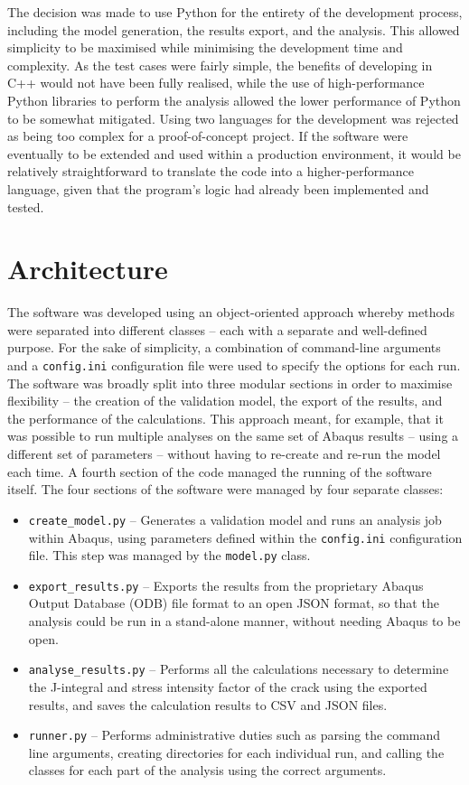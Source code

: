 The decision was made to use Python for the entirety of the development process, including the model generation, the results export, and the analysis. This allowed simplicity to be maximised while minimising the development time and complexity. As the test cases were fairly simple, the benefits of developing in C++ would not have been fully realised, while the use of high-performance Python libraries to perform the analysis allowed the lower performance of Python to be somewhat mitigated. Using two languages for the development was rejected as being too complex for a proof-of-concept project. If the software were eventually to be extended and used within a production environment, it would be relatively straightforward to translate the code into a higher-performance language, given that the program's logic had already been implemented and tested.

\newpage
\section{Architecture}

The software was developed using an object-oriented approach whereby methods were separated into different classes -- each with a separate and well-defined purpose. For the sake of simplicity, a combination of command-line arguments and a \texttt{config.ini} configuration file were used to specify the options for each run. The software was broadly split into three modular sections in order to maximise flexibility -- the creation of the validation model, the export of the results, and the performance of the calculations. This approach meant, for example, that it was possible to run multiple analyses on the same set of Abaqus results -- using a different set of parameters -- without having to re-create and re-run the model each time. A fourth section of the code managed the running of the software itself. The four sections of the software were managed by four separate classes:

\begin{itemize}
	\item \texttt{create\_model.py} -- Generates a validation model and runs an analysis job within Abaqus, using parameters defined within the \texttt{config.ini} configuration file. This step was managed by the \texttt{model.py} class.
	\item \texttt{export\_results.py} -- Exports the results from the proprietary Abaqus Output Database (ODB) file format to an open JSON format, so that the analysis could be run in a stand-alone manner, without needing Abaqus to be open.
	\item \texttt{analyse\_results.py} -- Performs all the calculations necessary to determine the J-integral and stress intensity factor of the crack using the exported results, and saves the calculation results to CSV and JSON files.
	\item \texttt{runner.py} -- Performs administrative duties such as parsing the command line arguments, creating directories for each individual run, and calling the classes for each part of the analysis using the correct arguments.
\end{itemize}

